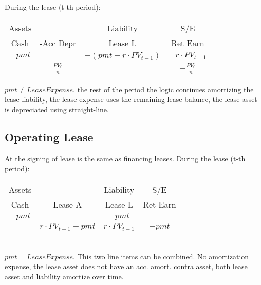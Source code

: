 During the lease (t-th period): \\
 	\begin{tabular}{ |c|c||c|c| } 
	\hline
	Assets  & & Liability  & S/E \\ 
	Cash & -Acc Depr  & Lease L & Ret Earn  \\ 
	\hline
	$-pmt$ & & $-(pmt-r\cdot PV_{t-1})$ &  $-r\cdot PV_{t-1}$ \\
	\hline
	       & $\frac{PV_0}{n}$ &    & $-\frac{PV_0}{n}$  \\
	\hline
\end{tabular} 
$pmt \neq LeaseExpense$. 
the rest of the period the logic continues amortizing the lease liability, the lease expense uses the remaining lease balance, the lease asset is depreciated using straight-line.

\subsection*{Operating Lease} 
At the signing of lease is the same as financing leases. During the lease (t-th period): \\
\begin{tabular}{ |c|c||c|c| } 
	\hline
	Assets  & & Liability  & S/E \\ 
	Cash & Lease A  & Lease L & Ret Earn  \\ 
	\hline
	$-pmt$ &    & $-pmt$ &   \\
	\hline
           & $r \cdot PV_{t-1} -pmt$ & $r \cdot PV_{t-1}$      & $-pmt$  \\
	\hline
\end{tabular} \\
$pmt = LeaseExpense$. This two line items can be combined.
No amortization expense, the lease asset does not have an acc. amort. contra asset, both lease asset and liability amortize over time.

